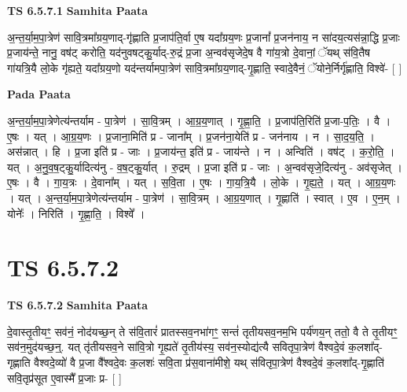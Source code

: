 \documentclass[17pt]{extarticle}
\begin{document}
\textbf{TS 6.5.7.1 } \newline
\textbf{Samhita Paata} \newline

अ॒न्त॒र्या॒म॒पा॒त्रेण॑ सावि॒त्रमा᳚ग्रय॒णाद्-गृ॑ह्णाति प्र॒जाप॑ति॒र्वा ए॒ष यदा᳚ग्रय॒णः प्र॒जानां᳚ प्र॒जन॑नाय॒ न सा॑दय॒त्यस॑न्ना॒द्धि प्र॒जाः प्र॒जाय॑न्ते॒ नानु॒ वष॑ट् करोति॒ यद॑नुवषट्कु॒र्याद्-रु॒द्रं प्र॒जा अ॒न्वव॑सृजेदे॒ष वै गा॑य॒त्रो दे॒वानां॒ ॅयथ् स॑वि॒तैष गा॑यत्रि॒यै लो॒के गृ॑ह्यते॒ यदा᳚ग्रय॒णो यद॑न्तर्यामपा॒त्रेण॑ सावि॒त्रमा᳚ग्रय॒णाद्-गृ॒ह्णाति॒ स्वादे॒वैनं॒ ॅयोने॒र्निर्गृ॑ह्णाति॒ विश्वे॑- [  ] \newline

\textbf{Pada Paata} \newline

अ॒न्त॒र्या॒म॒पा॒त्रेणेत्य॑न्तर्याम - पा॒त्रेण॑ । सा॒वि॒त्रम् । आ॒ग्र॒य॒णात् । गृ॒ह्णा॒ति॒ । प्र॒जाप॑ति॒रिति॑ प्र॒जा-प॒तिः॒ । वै । ए॒षः । यत् । आ॒ग्र॒य॒णः । प्र॒जाना॒मिति॑ प्र - जाना᳚म् । प्र॒जन॑ना॒येति॑ प्र - जन॑नाय । न । सा॒द॒य॒ति॒ । अस॑न्नात् । हि । प्र॒जा इति॑ प्र - जाः । प्र॒जाय॑न्त॒ इति॑ प्र - जाय॑न्ते । न । अन्विति॑ । वष॑ट् । क॒रो॒ति॒ । यत् । अ॒नु॒व॒ष॒ट्कु॒र्यादित्य॑नु - व॒ष॒ट्कु॒र्यात् । रु॒द्रम् । प्र॒जा इति॑ प्र - जाः । अ॒न्वव॑सृजे॒दित्य॑नु - अव॑सृजेत् । ए॒षः । वै । गा॒य॒त्रः । दे॒वाना᳚म् । यत् । स॒वि॒ता । ए॒षः । गा॒य॒त्रि॒यै । लो॒के । गृ॒ह्य॒ते॒ । यत् । आ॒ग्र॒य॒णः । यत् । अ॒न्त॒र्या॒म॒पा॒त्रेणेत्य॑न्तर्याम - पा॒त्रेण॑ । सा॒वि॒त्रम् । आ॒ग्र॒य॒णात् । गृ॒ह्णाति॑ । स्वात् । ए॒व । ए॒न॒म् । योनेः᳚ । निरिति॑ । गृ॒ह्णा॒ति॒ । विश्वे᳚ ।  \newline




\section*{ TS 6.5.7.2 }

\textbf{TS 6.5.7.2 } \newline
\textbf{Samhita Paata} \newline

दे॒वास्तृ॒तीयꣳ॒॒ सव॑नं॒ नोद॑यच्छ॒न् ते स॑वि॒तारं॑ प्रातस्सव॒नभा॑गꣳ॒॒ सन्तं॑ तृतीयसव॒नम॒भि पर्य॑णय॒न् ततो॒ वै ते तृ॒तीयꣳ॒॒ सव॑न॒मुद॑यच्छ॒न्॒. यत् तृ॑तीयसव॒ने सा॑वि॒त्रो गृ॒ह्यते॑ तृ॒तीय॑स्य॒ सव॑न॒स्योद्य॑त्यै सवितृपा॒त्रेण॑ वैश्वदे॒वं क॒लशा᳚द्-गृह्णाति वैश्वदे॒व्यो॑ वै प्र॒जा वै᳚श्वदे॒वः क॒लशः॑ सवि॒ता प्र॑स॒वाना॑मीशे॒ यथ् स॑वितृपा॒त्रेण॑ वैश्वदे॒वं क॒लशा᳚द्-गृ॒ह्णाति॑ सवि॒तृप्र॑सूत ए॒वास्मै᳚ प्र॒जाः प्र- [  ] \newline
\end{document}
